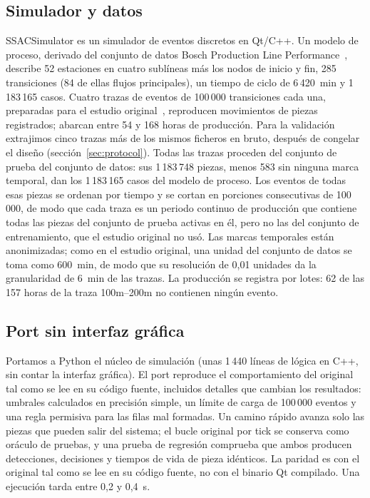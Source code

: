 \documentclass[preprint,11pt]{elsarticle}
\begin{document}
\subsection{Simulador y datos}
SSACSimulator es un simulador de eventos discretos en Qt/C++. Un modelo de proceso, derivado del conjunto de datos Bosch Production Line Performance~\cite{bosch2016kaggle}, describe 52 estaciones en cuatro sublíneas más los nodos de inicio y fin, 285 transiciones (84 de ellas flujos principales), un tiempo de ciclo de 6\,420~min y 1\,183\,165 casos. Cuatro trazas de eventos de 100\,000 transiciones cada una, preparadas para el estudio original~\cite{sanchez2020selfstar}, reproducen movimientos de piezas registrados; abarcan entre 54 y 168 horas de producción. Para la validación extrajimos cinco trazas más de los mismos ficheros en bruto, después de congelar el diseño (sección~\ref{sec:protocol}). Todas las trazas proceden del conjunto de prueba del conjunto de datos: sus 1\,183\,748 piezas, menos 583 sin ninguna marca temporal, dan los 1\,183\,165 casos del modelo de proceso. Los eventos de todas esas piezas se ordenan por tiempo y se cortan en porciones consecutivas de 100\,000, de modo que cada traza es un periodo continuo de producción que contiene todas las piezas del conjunto de prueba activas en él, pero no las del conjunto de entrenamiento, que el estudio original no usó. Las marcas temporales están anonimizadas; como en el estudio original, una unidad del conjunto de datos se toma como 600~min, de modo que su resolución de 0{,}01 unidades da la granularidad de 6~min de las trazas. La producción se registra por lotes: 62 de las 157 horas de la traza 100m--200m no contienen ningún evento.

\subsection{Port sin interfaz gráfica}
Portamos a Python el núcleo de simulación (unas 1\,440 líneas de lógica en C++, sin contar la interfaz gráfica). El port reproduce el comportamiento del original tal como se lee en su código fuente, incluidos detalles que cambian los resultados: umbrales calculados en precisión simple, un límite de carga de 100\,000 eventos y una regla permisiva para las filas mal formadas. Un camino rápido avanza solo las piezas que pueden salir del sistema; el bucle original por tick se conserva como oráculo de pruebas, y una prueba de regresión comprueba que ambos producen detecciones, decisiones y tiempos de vida de pieza idénticos. La paridad es con el original tal como se lee en su código fuente, no con el binario Qt compilado. Una ejecución tarda entre 0{,}2 y 0{,}4~s.
\end{document}
